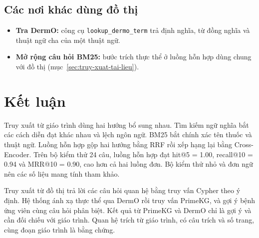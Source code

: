 \subsection{Các nơi khác dùng đồ thị}

\begin{itemize}
  \item \textbf{Tra DermO:} công cụ \texttt{lookup\_dermo\_term} trả định nghĩa, từ đồng nghĩa và thuật ngữ cha của một thuật ngữ.
  \item \textbf{Mở rộng câu hỏi BM25:} bước trích thực thể ở luồng hỗn hợp dùng chung với đồ thị (mục~\ref{sec:truy-xuat-tai-lieu}).
\end{itemize}

\section{Kết luận}

Truy xuất từ giáo trình dùng hai hướng bổ sung nhau. Tìm kiếm ngữ nghĩa bắt các cách diễn đạt khác nhau và lệch ngôn ngữ. BM25 bắt chính xác tên thuốc và thuật ngữ. Luồng hỗn hợp gộp hai hướng bằng RRF rồi xếp hạng lại bằng Cross-Encoder. Trên bộ kiểm thử 24 câu, luồng hỗn hợp đạt hit@5 = 1.00, recall@10 = 0.94 và MRR@10 = 0.90, cao hơn cả hai luồng đơn. Bộ kiểm thử nhỏ và đơn ngữ nên các số liệu mang tính tham khảo.

Truy xuất từ đồ thị trả lời các câu hỏi quan hệ bằng truy vấn Cypher theo ý định. Hệ thống ánh xạ thực thể qua DermO rồi truy vấn PrimeKG, và gợi ý bệnh ứng viên cùng câu hỏi phân biệt. Kết quả từ PrimeKG và DermO chỉ là gợi ý và cần đối chiếu với giáo trình. Quan hệ trích từ giáo trình, có câu trích và số trang, cùng đoạn giáo trình là bằng chứng.
